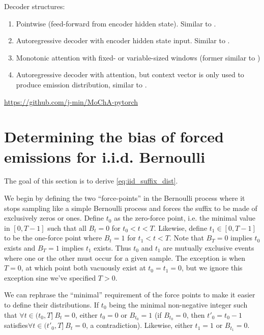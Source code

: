 \documentclass{article}
\begin{document}
Decoder structures:
%
\begin{enumerate}
    \item Pointwise (feed-forward from encoder hidden state). Similar to
          \citet{luoLearningOnlineAlignments2017,lawsonLearningHardAlignments2018}.
    \item Autoregressive decoder with encoder hidden state input. Similar to
          \citet{raffelOnlineLineartimeAttention2017}.
    \item Monotonic attention with fixed- or variable-sized windows
          (former similar to \citet{chiuMonotonicChunkwiseAttention2018})
    \item Autoregressive decoder with attention, but context vector is only
          used to produce emission distribution, similar to
          \citet{wuHardNonmonotonicAttention2018,wuExactHardMonotonic2019}.
\end{enumerate}
%

\url{https://github.com/j-min/MoChA-pytorch}




\appendix

\section{Determining the bias of forced emissions for i.i.d. Bernoulli}
\label{sec:suffix}

The goal of this section is to derive \cref{eq:iid_suffix_dist}.

We begin by defining the two ``force-points'' in the Bernoulli process where it
stops sampling like a simple Bernoulli process and forces the suffix to be made
of exclusively zeros or ones. Define $t_0$ as the zero-force point, i.e. the
minimal value in $[0, T - 1]$ such that all $B_t = 0$ for $t_0 < t < T$.
Likewise, define $t_1 \in [0, T - 1]$ to be the one-force point where $B_t = 1$
for $t_1 < t < T$. Note that $B_T = 0$ implies $t_0$ exists and $B_T = 1$
implies $t_1$ exists. Thus $t_0$ and $t_1$ are mutually exclusive events where
one or the other must occur for a given sample. The exception is when $T = 0$,
at which point both vacuously exist at $t_0 = t_1 = 0$, but we ignore this
exception sine we've specified $T > 0$.

We can rephrase the ``minimal'' requirement of the force points to make it
easier to define their distributions. If $t_0$ being the minimal non-negative
integer such that $\forall t \in (t_0, T] \> B_t = 0$, either $t_0 = 0$ or
$B_{t_0} = 1$ (if $B_{t_0} = 0$, then $t'_0 = t_0 - 1$ satisfies$\forall t \in (t'_0, T] \> B_t = 0$, a contradiction). Likewise, either $t_1 = 1$ or $B_{t_1}
= 0$.
\end{document}
